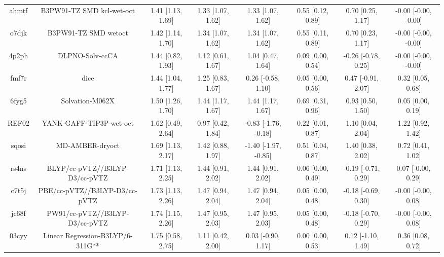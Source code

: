 \documentclass{article}
\begin{document}
\begin{center}
\begin{longtable}{|cccccccc|}
 ahmtf &                          B3PW91-TZ SMD kcl-wet-oct &  1.41 [1.13, 1.69] &  1.33 [1.07, 1.62] &     1.33 [1.07, 1.62] &  0.55 [0.12, 0.89] &    0.70 [0.25, 1.17] &  -0.00 [-0.00, -0.00] \\
 o7djk &                               B3PW91-TZ SMD wetoct &  1.42 [1.14, 1.70] &  1.34 [1.07, 1.62] &     1.34 [1.07, 1.62] &  0.55 [0.11, 0.89] &    0.70 [0.23, 1.17] &  -0.00 [-0.00, -0.00] \\
 4p2ph &                                    DLPNO-Solv-ccCA &  1.44 [0.82, 1.93] &  1.12 [0.61, 1.67] &     1.04 [0.47, 1.64] &  0.09 [0.00, 0.54] &  -0.26 [-0.78, 0.25] &  -0.00 [-0.00, -0.00] \\
 fmf7r &                                               dice &  1.44 [1.04, 1.77] &  1.25 [0.83, 1.67] &    0.26 [-0.58, 1.10] &  0.05 [0.00, 0.56] &   0.47 [-0.91, 2.07] &     0.32 [0.05, 0.68] \\
 6fyg5 &                                    Solvation-M062X &  1.50 [1.26, 1.70] &  1.44 [1.17, 1.67] &     1.44 [1.17, 1.67] &  0.69 [0.31, 0.96] &    0.93 [0.50, 1.50] &     0.05 [0.00, 0.19] \\
 REF02 &                            YANK-GAFF-TIP3P-wet-oct &  1.62 [0.49, 2.64] &  0.97 [0.42, 1.84] &  -0.83 [-1.76, -0.18] &  0.22 [0.01, 0.87] &    1.10 [0.04, 2.04] &     1.22 [0.92, 1.42] \\
 sqosi &                                    MD-AMBER-dryoct &  1.69 [1.13, 2.17] &  1.42 [0.88, 1.97] &  -1.40 [-1.97, -0.85] &  0.51 [0.04, 0.87] &    1.40 [0.38, 2.02] &     0.72 [0.41, 1.02] \\
 rs4ns &                     BLYP/cc-pVTZ//B3LYP-D3/cc-pVTZ &  1.71 [1.13, 2.25] &  1.44 [0.91, 2.02] &     1.44 [0.91, 2.02] &  0.06 [0.00, 0.49] &  -0.19 [-0.71, 0.29] &    0.07 [-0.00, 0.29] \\
 c7t5j &                      PBE/cc-pVTZ//B3LYP-D3/cc-pVTZ &  1.73 [1.13, 2.26] &  1.47 [0.94, 2.04] &     1.47 [0.94, 2.04] &  0.05 [0.00, 0.48] &  -0.18 [-0.69, 0.30] &   -0.00 [-0.00, 0.08] \\
 jc68f &                     PW91/cc-pVTZ//B3LYP-D3/cc-pVTZ &  1.74 [1.15, 2.26] &  1.47 [0.95, 2.03] &     1.47 [0.95, 2.03] &  0.05 [0.00, 0.48] &  -0.18 [-0.70, 0.29] &   -0.00 [-0.00, 0.08] \\
 03cyy &                   Linear Regression-B3LYP/6-311G** &  1.75 [0.58, 2.75] &  1.11 [0.42, 2.00] &    0.03 [-0.90, 1.17] &  0.00 [0.00, 0.53] &   0.12 [-1.10, 1.49] &     0.36 [0.08, 0.72] \\

\end{longtable}
\end{center}
\end{document}
